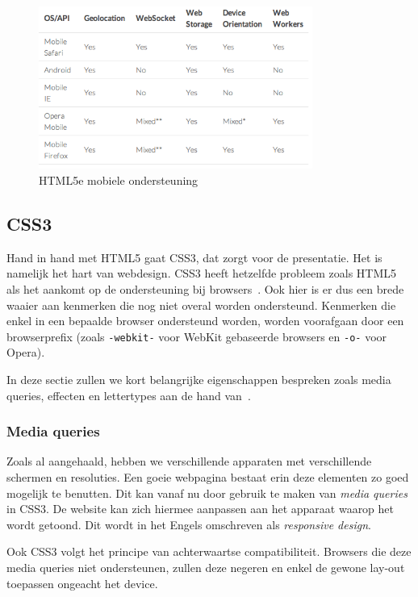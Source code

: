 \begin{figure}
  \centering
  \includegraphics[width=0.8\textwidth]{figuren/html5e}
  \caption{HTML5e mobiele ondersteuning~\cite{Hales2012}}
  \label{fig:html5e}
\end{figure}

\subsection{CSS3}
\label{ref:css3}
Hand in hand met HTML5 gaat CSS3, dat zorgt voor de presentatie. Het is namelijk het hart van webdesign. CSS3 heeft hetzelfde probleem zoals HTML5 als het aankomt op de ondersteuning bij browsers~\cite{MacDonald2011}. Ook hier is er dus een brede waaier aan kenmerken die nog niet overal worden ondersteund. Kenmerken die enkel in een bepaalde browser ondersteund worden, worden voorafgaan door een browserprefix (zoals \texttt{-webkit-} voor WebKit gebaseerde browsers en \texttt{-o-} voor Opera).

In deze sectie zullen we kort belangrijke eigenschappen bespreken zoals media queries, effecten en lettertypes aan de hand van~\cite{MacDonald2011}.

\subsubsection{Media queries}
Zoals al aangehaald, hebben we verschillende apparaten met verschillende schermen en resoluties. Een goeie webpagina bestaat erin deze elementen zo goed mogelijk te benutten. Dit kan vanaf nu door gebruik te maken van \emph{media queries} in CSS3. De website kan zich hiermee aanpassen aan het apparaat waarop het wordt getoond. Dit wordt in het Engels omschreven als \emph{responsive design}.

Ook CSS3 volgt het principe van achterwaartse compatibiliteit. Browsers die deze media queries niet ondersteunen, zullen deze negeren en enkel de gewone lay-out toepassen ongeacht het device.

